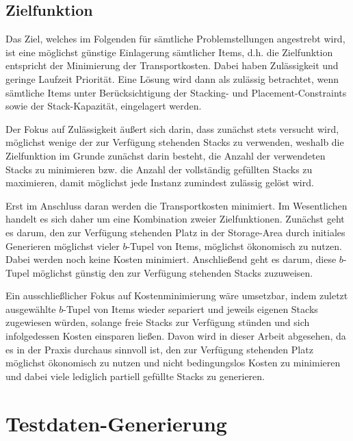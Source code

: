 \subsection{Zielfunktion}
\label{sec:objective}

Das Ziel, welches im Folgenden für sämtliche Problemstellungen angestrebt wird, ist eine möglichst günstige
Einlagerung sämtlicher Items, d.h. die Zielfunktion entspricht der Minimierung der Transportkosten.
Dabei haben Zulässigkeit und geringe Laufzeit Priorität. Eine Lösung wird dann als zulässig betrachtet,
wenn sämtliche Items unter Berücksichtigung der Stacking- und Placement-Constraints sowie der Stack-Kapazität, eingelagert werden.

Der Fokus auf Zulässigkeit äußert sich darin, dass zunächst stets versucht wird, möglichst wenige der zur Verfügung stehenden Stacks zu verwenden, weshalb die Zielfunktion im Grunde zunächst darin besteht, die Anzahl der verwendeten Stacks zu minimieren bzw. die Anzahl der vollständig gefüllten Stacks zu maximieren, damit möglichst jede Instanz zumindest zulässig gelöst wird.

Erst im Anschluss daran werden die Transportkosten minimiert. Im Wesentlichen handelt es sich daher
um eine Kombination zweier Zielfunktionen. Zunächst geht es darum, den zur Verfügung stehenden Platz in
der Storage-Area durch initiales Generieren möglichst vieler $b$-Tupel von Items, möglichst ökonomisch zu nutzen.
Dabei werden noch keine Kosten minimiert. Anschließend geht es darum, diese $b$-Tupel möglichst günstig
den zur Verfügung stehenden Stacks zuzuweisen.

Ein ausschließlicher Fokus auf Kostenminimierung wäre umsetzbar, indem zuletzt ausgewählte $b$-Tupel
von Items wieder separiert und jeweils eigenen Stacks zugewiesen würden, solange freie Stacks zur Verfügung
stünden und sich infolgedessen Kosten einsparen ließen. Davon wird in dieser Arbeit abgesehen, da es in der Praxis durchaus sinnvoll ist, den zur Verfügung stehenden Platz möglichst ökonomisch zu nutzen und nicht bedingungslos Kosten zu minimieren und dabei viele lediglich partiell gefüllte Stacks zu generieren.

\pagebreak

\section{Testdaten-Generierung}
\label{sec:test_data}

